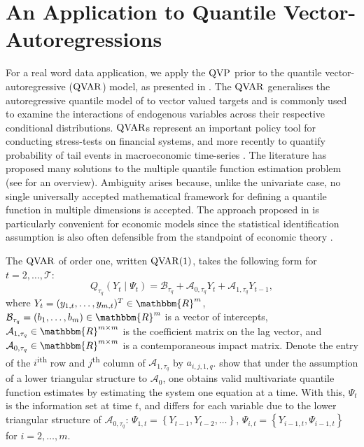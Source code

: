 \section{An Application to Quantile Vector-Autoregressions}\label{sec:application}
For a real word data application, we apply the $\operatorname{QVP}$ prior to the quantile vector-autoregressive ($\operatorname{QVAR}$) model, as presented in \citet{chavleishvili2024forecasting}. The $\operatorname{QVAR}$ generalises the autoregressive quantile model of \citet{koenker2006quantile} to vector valued targets and is commonly used to examine the interactions of endogenous variables across their respective conditional distributions. $\operatorname{QVAR}$s represent an important policy tool for conducting stress-tests on financial systems, and more recently to quantify probability of tail events in macroeconomic time-series \citep{chavleishvili2023quantifying,chavleishvili2023measuring}. The literature has proposed many solutions to the multiple quantile function estimation problem (see \citet{hallin2017multiple} for an overview). Ambiguity arises because, unlike the univariate case, no single universally accepted mathematical framework for defining  a quantile function in multiple dimensions is accepted. The approach proposed in \citet{wei2008approach} is particularly convenient for economic models since the statistical identification assumption is also often defensible from the standpoint of economic theory \citep{chavleishvili2024forecasting}.
%

%
The $\operatorname{QVAR}$ of order one, written $\operatorname{QVAR}(1)$, takes the following form for $t=2,\dotsc,\mathcal{T}$: 
%
\begin{equation} \label{eq:QVAR-qform}
    Q_{\tau_q}(Y_t \mid \Psi_t) = \mathcal{B}_{\tau_q} + \mathcal{A}_{0,{\tau_q}} Y_t + \mathcal{A}_{1,{\tau_q}} Y_{t-1},
\end{equation}
%
where $Y_t = (y_{1,t},\dotsc,y_{m,t})^T \in \mathbbm{R}^{m}$, $\mathcal{B}_{\tau_q} = ({b}_{1}, \dotsc, {b}_m) \in \mathbbm{R}^m $ is a vector of intercepts, $\mathcal{A}_{1,\tau_{q}} \in \mathbbm{R}^{m \times m}$ is the coefficient matrix on the lag vector, and $\mathcal{A}_{0,\tau_q} \in \mathbbm{R}^{m \times m}$ is a contemporaneous impact matrix. Denote the entry of the $i$\textsuperscript{ith} row and $j$\textsuperscript{th} column of $\mathcal{A}_{1,\tau_q}$ by $a_{i,j,1,q}$. \citet{wei2008approach} show that under the assumption of a lower triangular structure to $\mathcal{A}_0$, one obtains valid multivariate quantile function estimates by estimating the system one equation at a time. With this, $\Psi_t$ is the information set at time $t$, and differs for each variable due to the lower triangular structure of $\mathcal{A}_{0,\tau_q}$: $\Psi_{1,t} = \left\{ Y_{t-1} , Y_{t-2} ,\dotsc  \right\}$, $\Psi_{i,t} = \left\{ Y_{i-1,t},\Psi_{i-1,t} \right\}$ for $i = 2,\dotsc,m$. 
%

